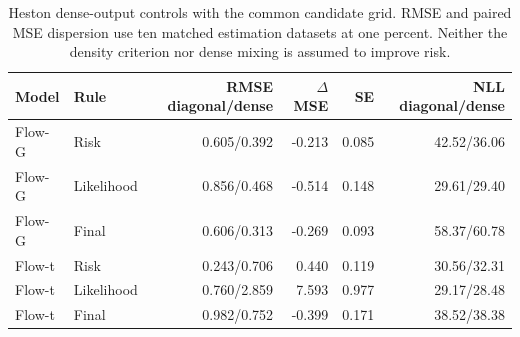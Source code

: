 \documentclass[11pt]{article}
\theoremstyle{definition}\newtheorem{definition}[theorem]{Definition}
\theoremstyle{remark}\newtheorem{remark}[theorem]{Remark}
\begin{document}
\begin{table}[htbp]
\centering\footnotesize
\setlength{\tabcolsep}{4pt}
\begin{tabular}{llrrrr}
\toprule
Model & Rule & RMSE diagonal/dense & $\Delta$ MSE & SE & NLL diagonal/dense \\
\midrule
Flow-G & Risk & 0.605/0.392 & -0.213 & 0.085 & 42.52/36.06 \\
Flow-G & Likelihood & 0.856/0.468 & -0.514 & 0.148 & 29.61/29.40 \\
Flow-G & Final & 0.606/0.313 & -0.269 & 0.093 & 58.37/60.78 \\
Flow-t & Risk & 0.243/0.706 & 0.440 & 0.119 & 30.56/32.31 \\
Flow-t & Likelihood & 0.760/2.859 & 7.593 & 0.977 & 29.17/28.48 \\
Flow-t & Final & 0.982/0.752 & -0.399 & 0.171 & 38.52/38.38 \\
\bottomrule
\end{tabular}
\caption{Heston dense-output controls with the common candidate grid. RMSE and paired MSE dispersion use ten matched estimation datasets at one percent. Neither the density criterion nor dense mixing is assumed to improve risk.}\label{tab:r4-dense-heston}
\end{table}
\end{document}
